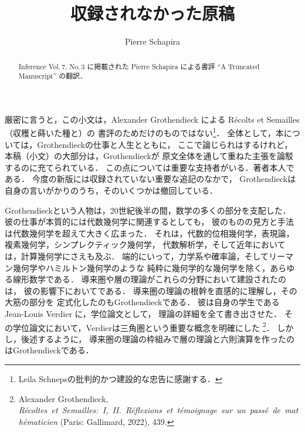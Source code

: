 \documentclass[9pt, a4paper, dvipdfmx]{jlreq}
\theoremstyle{definition}
\theoremstyle{mystyle}
\numberwithin{equation}{section} %
\begin{document}
\title{収録されなかった原稿}
\author{Pierre Schapira}
\date{}
\maketitle
\begin{abstract}
    Inference Vol.\,7, No.\,3
    に掲載された
    Pierre Schapira による書評 ``A Truncated Manuscript'' の翻訳．
\end{abstract}


厳密に言うと，この小文は，Alexander Grothendieck による
R\'ecolts et Semailles（収穫と蒔いた種と）の
書評のためだけのものではない\footnote[1]{
    Leila Schnepsの批判的かつ建設的な忠告に感謝する．
}．
全体として，本については，Grothendieckの仕事と人生とともに，
ここで論じられはするけれど，本稿（小文）の大部分は，Grothendieckが
原文全体を通して重ねた主張を論駁するのに充てられている．
この点については重要な支持者がいる．著者本人である．
今度の新版には収録されていない重要な追記のなかで，
Grothendieckは自身の言いがかりのうち，そのいくつかは撤回している．

Grothendieckという人物は，20世紀後半の間，数学の多くの部分を支配した．
彼の仕事が本質的には代数幾何学に関連するとしても，
彼のものの見方と手法は代数幾何学を超えて大きく広まった．
それは，代数的位相幾何学，表現論，複素幾何学，シンプレクティック幾何学，
代数解析学，そして近年においては，計算幾何学にさえも及ぶ．
端的にいって，力学系や確率論，そしてリーマン幾何学やハミルトン幾何学のような
純粋に幾何学的な幾何学を除く，あらゆる線形数学である．
導来圏や層の理論がこれらの分野において建設されたのは，
彼の影響下においてである．
導来圏の理論の根幹を直感的に理解し，その大筋の部分を
定式化したのもGrothendieckである．
彼は自身の学生である Jean-Louis Verdier に，学位論文として，
理論の詳細を全て書き出させた．
その学位論文において，Verdierは三角圏という重要な概念を明確にした
\footnote[2]{
    Alexander Grothendieck,
    \textit{R\'ecoltes\ et\ Semailles:\ I,\ II.\ R\'eflexions\ et\ t\'emoignage\ sur\ un\ pass\'e\ de\ math\'ematicien} 
    (Paris: Gallimard, 2022), 439.
}．
しかし，後述するように，
導来圏の理論の枠組みで層の理論と六則演算を作ったのはGrothendieckである．
\end{document}
